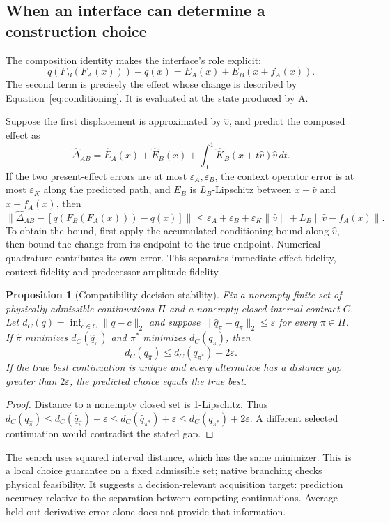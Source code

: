 \documentclass[11pt]{article}
\newtheorem{proposition}{Proposition}
\newcommand{\eps}{\varepsilon}
\begin{document}
\subsection{When an interface can determine a construction choice}
The composition identity makes the interface's role explicit:
\begin{equation}
 q(F_B(F_A(x)))-q(x)=E_A(x)+E_B(x+f_A(x)).
 \label{eq:composition}
\end{equation}
The second term is precisely the effect whose change is described by
Equation~\ref{eq:conditioning}. It is evaluated at the state produced by A.

Suppose the first displacement is approximated by $\widehat v$, and predict
the composed effect as
\[
 \widehat\Delta_{AB}=\widehat E_A(x)+\widehat E_B(x)
       +\int_0^1\widehat K_B(x+t\widehat v)\widehat v\,dt.
\]
If the two present-effect errors are at most $\eps_A,\eps_B$, the context
operator error is at most $\eps_K$ along the predicted path, and $E_B$ is
$L_B$-Lipschitz between $x+\widehat v$ and $x+f_A(x)$, then
\begin{equation}
 \|\widehat\Delta_{AB}-[q(F_B(F_A(x)))-q(x)]\|
 \le \eps_A+\eps_B+\eps_K\|\widehat v\|
          +L_B\|\widehat v-f_A(x)\|.
 \label{eq:pair-error}
\end{equation}
To obtain the bound, first apply the accumulated-conditioning bound along
$\widehat v$, then bound the change from its endpoint to the true endpoint.
Numerical quadrature contributes its own error. This separates immediate
effect fidelity, context fidelity and predecessor-amplitude fidelity.

\begin{proposition}[Compatibility decision stability]
Fix a nonempty finite set of physically admissible continuations $\Pi$ and a
nonempty closed interval contract $C$. Let
$d_C(q)=\inf_{c\in C}\|q-c\|_2$ and suppose
$\|\widehat q_\pi-q_\pi\|_2\le\eps$ for every $\pi\in\Pi$.
If $\widehat\pi$ minimizes $d_C(\widehat q_\pi)$ and $\pi^*$ minimizes
$d_C(q_\pi)$, then
\[
 d_C(q_{\widehat\pi})\le d_C(q_{\pi^*})+2\eps.
\]
If the true best continuation is unique and every alternative has a
distance gap greater than $2\eps$, the predicted choice equals the true best.
\end{proposition}
\begin{proof}
Distance to a nonempty closed set is 1-Lipschitz. Thus
$d_C(q_{\widehat\pi})\le d_C(\widehat q_{\widehat\pi})+\eps
\le d_C(\widehat q_{\pi^*})+\eps\le d_C(q_{\pi^*})+2\eps$.
A different selected continuation would contradict the stated gap.
\end{proof}
The search uses squared interval distance, which has the same minimizer.
This is a local choice guarantee on a fixed admissible set; native branching
checks physical feasibility. It suggests a decision-relevant acquisition
target: prediction accuracy relative to the separation between competing
continuations. Average held-out derivative error alone does not provide that
information.
\end{document}
